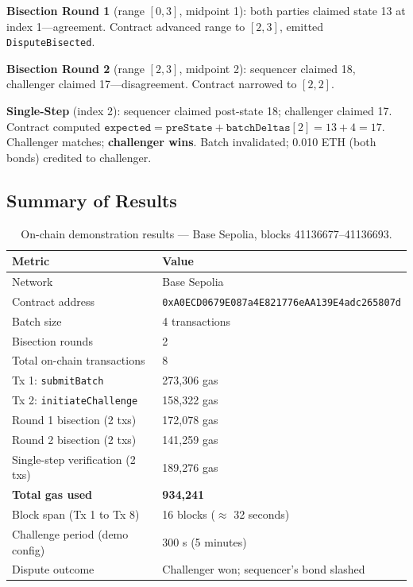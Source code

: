 \documentclass[11pt,letterpaper]{article}
\begin{document}
\medskip
\noindent\textbf{Bisection Round 1} (range $[0,3]$, midpoint 1): both parties claimed state 13 at index 1---agreement. Contract advanced range to $[2,3]$, emitted \texttt{DisputeBisected}.

\noindent\textbf{Bisection Round 2} (range $[2,3]$, midpoint 2): sequencer claimed 18, challenger claimed 17---disagreement. Contract narrowed to $[2,2]$.

\noindent\textbf{Single-Step} (index 2): sequencer claimed post-state 18; challenger claimed 17. Contract computed $\texttt{expected} = \texttt{preState} + \texttt{batchDeltas}[2] = 13 + 4 = 17$. Challenger matches; \textbf{challenger wins}. Batch invalidated; 0.010 ETH (both bonds) credited to challenger.

\subsection{Summary of Results}

\begin{table}[h!]
\centering
\renewcommand{\arraystretch}{1.3}
\begin{tabular}{ll}
\toprule
\textbf{Metric} & \textbf{Value} \\
\midrule
Network & Base Sepolia \\
Contract address & \texttt{0xA0ECD0679E087a4E821776eAA139E4adc265807d} \\
Batch size & 4 transactions \\
Bisection rounds & 2 \\
Total on-chain transactions & 8 \\
Tx 1: \texttt{submitBatch} & 273,306 gas \\
Tx 2: \texttt{initiateChallenge} & 158,322 gas \\
Round 1 bisection (2 txs) & 172,078 gas \\
Round 2 bisection (2 txs) & 141,259 gas \\
Single-step verification (2 txs) & 189,276 gas \\
\textbf{Total gas used} & \textbf{934,241} \\
Block span (Tx 1 to Tx 8) & 16 blocks ($\approx$ 32 seconds) \\
Challenge period (demo config) & 300 s (5 minutes) \\
Dispute outcome & Challenger won; sequencer's bond slashed \\
\bottomrule
\end{tabular}
\caption{On-chain demonstration results --- Base Sepolia, blocks 41136677--41136693.}
\end{table}
\end{document}
